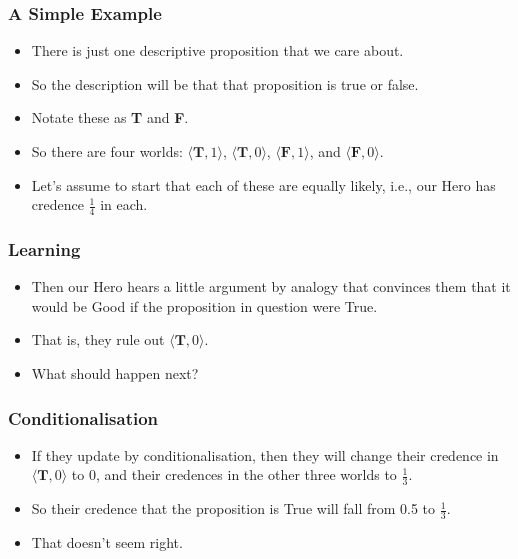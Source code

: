 \begin{frame}[fragile]
\frametitle{A Simple Example}
\label{asimpleexample}

\begin{itemize}
\item{} There is just one descriptive proposition that we care about.

\item{} So the description will be that that proposition is true or false.

\item{} Notate these as \textbf{T} and \textbf{F}.

\item{} So there are four worlds: $\langle \textbf{T}, 1 \rangle$, $\langle \textbf{T}, 0 \rangle$, $\langle \textbf{F}, 1 \rangle$, and $\langle \textbf{F}, 0 \rangle$.

\item{} Let's assume to start that each of these are equally likely, i.e., our Hero has credence $\frac{1}{4}$ in each.

\end{itemize}

\end{frame}

\begin{frame}[fragile]
\frametitle{Learning}
\label{learning}

\begin{itemize}
\item{} Then our Hero hears a little argument by analogy that convinces them that it would be Good if the proposition in question were True.

\item{} That is, they rule out $\langle \textbf{T}, 0 \rangle$.

\item{} What should happen next?

\end{itemize}

\end{frame}

\begin{frame}[fragile]
\frametitle{Conditionalisation}
\label{conditionalisation}

\begin{itemize}
\item{} If they update by conditionalisation, then they will change their credence in $\langle \textbf{T}, 0 \rangle$ to 0, and their credences in the other three worlds to $\frac{1}{3}$.

\item{} So their credence that the proposition is True will fall from 0.5 to $\frac{1}{3}$.

\item{} That doesn't seem right.

\end{itemize}

\end{frame}

